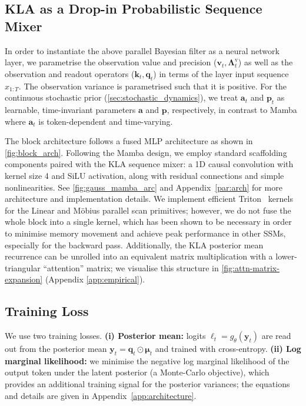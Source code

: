 \documentclass{article}
\newcommand{\our}{\textsc{KLA}\xspace}
\begin{document}
\subsection{\our as a Drop-in Probabilistic Sequence Mixer}
\label{sec:ka_layer}

In order to instantiate the above parallel Bayesian filter as a neural network layer, we parametrise the observation value and precision ($\mathbf{v}_t, \boldsymbol{\Lambda}^{\mathrm{v}}_t$) as well as the observation and readout operators ($\mathbf{k}_t, \mathbf{q}_t$) in terms of the layer input sequence $x_{1:T}$.
The observation variance is parametrised such that it is positive. For the continuous stochastic prior (\cref{sec:stochastic_dynamics}), we treat $\mathbf{a}_t$ and $\mathbf{p}_t$ as learnable, time-invariant parameters
$\mathbf{a}$ and $\mathbf{p}$, respectively, in contrast to Mamba where $\mathbf{a}_t$ is token-dependent and time-varying.


The block architecture follows a fused MLP architecture as shown in \cref{fig:block_arch}. Following the Mamba design, we employ standard scaffolding components paired with the \our sequence mixer: a 1D causal convolution with kernel size 4 and SiLU activation, along with residual connections and simple nonlinearities. See \cref{fig:gauss_mamba_arc} and Appendix~\ref{par:arch} for more architecture and implementation details. We implement efficient Triton~\cite{tillet2019triton} kernels for the Linear and M\"{o}bius parallel scan primitives; however, we do not fuse the whole block into a single kernel, which has been shown to be necessary in order to minimise memory movement and achieve peak performance in other SSMs, especially for the backward pass. Additionally, the KLA posterior mean recurrence can be unrolled into an equivalent matrix multiplication with a lower-triangular ``attention'' matrix; we visualise this structure in \cref{fig:attn-matrix-expansion} (Appendix \ref{app:empirical}).


\subsection{Training Loss}
We use two training losses. \textbf{(i) Posterior mean:} logits $\boldsymbol{\ell}_t = g_\theta(\mathbf{y}_t)$ are read out from the posterior mean $\mathbf{y}_t=\mathbf{q}_t\odot \boldsymbol{\mu}_t$ and trained with cross-entropy. \textbf{(ii) Log marginal likelihood:} we minimise the negative log marginal likelihood of the output token under the latent posterior (a Monte-Carlo objective), which provides an additional training signal for the posterior variances; the equations and details are given in Appendix~\ref{app:architecture}.
\end{document}
